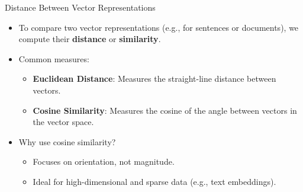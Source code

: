 \documentclass{beamer}
\begin{document}
\begin{frame}{Distance Between Vector Representations}
    \begin{itemize}
        \item To compare two vector representations (e.g., for sentences or documents), we compute their \textbf{distance} or \textbf{similarity}.
        \item Common measures:
        \begin{itemize}
            \item \textbf{Euclidean Distance}: Measures the straight-line distance between vectors.
            \item \textbf{Cosine Similarity}: Measures the cosine of the angle between vectors in the vector space.
        \end{itemize}
        \item Why use cosine similarity?
        \begin{itemize}
            \item Focuses on orientation, not magnitude.
            \item Ideal for high-dimensional and sparse data (e.g., text embeddings).
        \end{itemize}
    \end{itemize}
\end{frame}
\end{document}
